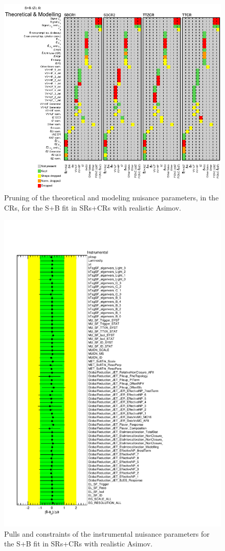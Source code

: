\begin{figure}[htbp]
	\centering
	\includegraphics[width=.65\textwidth]{Chapters/CH8/figures/SPLUSB_CRSR_UsingDL1rcFullSys/pruning_split4}
	\caption{Pruning of the theoretical and modeling nuisance parameters, in the CRs, for the S+B \tZc fit in SRs+CRs with realistic Asimov.}%
	\label{fig:stat:tzc:splusb:crsr:pruning4}
\end{figure}

\begin{figure}[htbp]
	\centering
	\includegraphics[width=.8\textwidth]{Chapters/CH8/figures/SPLUSB_CRSR_UsingDL1rcFullSys/NuisPar_Instrumental}
	\caption{Pulls and constraints of the instrumental nuisance parameters for the S+B \tZc fit in SRs+CRs with realistic Asimov.}%
	\label{fig:stat:tzc:splusb:crsr:np:instr}
\end{figure}

